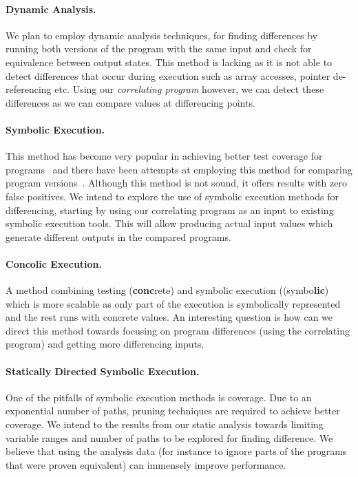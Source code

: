 \paragraph{Dynamic Analysis.} We plan to employ dynamic analysis techniques,
    for finding differences by running both versions of the program with
    the same input and check for equivalence between output states. This
    method is lacking as it is not able to detect differences that occur
    during execution such as array accesses, pointer de-referencing etc. Using our \emph{correlating program} however, we
    can detect these differences as we can compare values at differencing
    points.

\paragraph{Symbolic Execution.} This method has become very popular in
    achieving better test coverage for
    programs~\cite{CadarDunbarEngler08} and there have been attempts at
    employing this method for comparing program
    versions~\cite{EnglerRamos11, HawblitzelKawaguchiLahiriRebelo12,DwyerElbaumPerson08}.
    Although this method is not sound, it offers results with zero false
    positives. We intend to explore the use of symbolic execution methods
    for differencing, starting by using our correlating program as an
    input to existing symbolic execution tools. This will allow producing actual input values which generate different outputs in the compared programs.

\paragraph{Concolic Execution.} A method combining testing (\textbf{conc}rete)
    and symbolic execution ((symbo\textbf{lic}) which is more scalable as
    only part of the execution is symbolically represented and the rest
    runs with concrete values. An interesting question is how can we
    direct this method towards focusing on program differences (using the
    correlating program) and getting more differencing inputs.

\paragraph{Statically Directed Symbolic Execution.} One of the pitfalls of
    symbolic execution methods is coverage. Due to an exponential number
    of paths, pruning techniques are required to achieve better coverage.
    We intend to the results from our static analysis towards limiting
    variable ranges and number of paths to be explored for finding
    difference. We believe that using the analysis data (for instance to
    ignore parts of the programs that were proven equivalent) can
    immensely improve performance.

